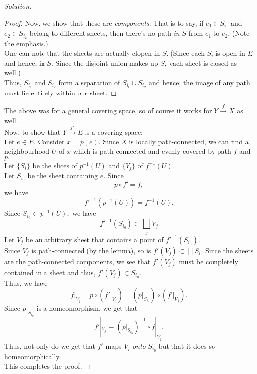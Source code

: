 \documentclass[12pt]{article}
\newenvironment{blockquote}
{\begin{mdframed}[skipabove=0pt, skipbelow=0pt, innertopmargin=4pt, innerbottommargin=4pt, bottomline=false,topline=false,rightline=false, linewidth=2pt]}
{\end{mdframed}}
\newenvironment{soln}{\begin{proof}[Solution]}{\end{proof}}
\begin{document}
\begin{soln}
\begin{blockquote}
\begin{proof}
			Now, we show that these are \emph{components}. That is to say, if $e_1 \in S_{i_1}$ and $e_2 \in S_{i_2}$ belong to different sheets, then there's no path \emph{in $S$} from $e_1$ to $e_2.$ (Note the emphasis.)\\
			One can note that the sheets are actually clopen in $S.$ (Since each $S_i$ is open in $E$ and hence, in $S.$ Since the disjoint union makes up $S,$ each sheet is closed as well.)\\
			Thus, $S_{i_1}$ and $S_{i_2}$ form a separation of $S_{i_1}\cup S_{i_2}$ and hence, the image of any path must lie entirely within one sheet.
		\end{proof}
	\end{blockquote}
	The above was for a general covering space, so of course it works for $Y \overset{f}{\longrightarrow} X$ as well.\\
	Now, to show that $Y\overset{f'}{\longrightarrow}E$ is a covering space:\\
	Let $e \in E.$ Consider $x = p(e).$ Since $X$ is locally path-connected, we can find a neighbourhood $U$ of $x$ which is path-connected and evenly covered by path $f$ and $p.$\\
	Let $\{S_i\}$ be the slices of $p^{-1}(U)$ and $\{V_j\}$ of $f^{-1}(U).$\\
	Let $S_{i_0}$ be the sheet containing $e.$ Since
	\begin{equation*} 
		p\circ f' = f,
	\end{equation*}
	we have
	\begin{equation*} 
		f'^{-1}(p^{-1}(U)) = f^{-1}(U).
	\end{equation*}
	Since $S_{i_0} \subset p^{-1}(U),$ we have 
	\begin{equation*} 
		f'^{-1}(S_{i_0}) \subset \bigsqcup_j V_j
	\end{equation*}
	Let $V_j$ be an arbitrary sheet that contains a point of $f'^{-1}(S_{i_0}).$\\
	Since $V_j$ is path-connected (by the lemma), so is $f'(V_j) \subset \bigsqcup S_i.$ Since the sheets are the path-connected components, we see that $f'(V_j)$ must be completely contained in a sheet and thus, $f'(V_j) \subset S_{i_0}.$ \\
	Thus, we have
	\begin{equation*} 
		f|_{V_j} = p\circ(f'|_{V_j}) = \left(p|_{S_{i_0}}\right)\circ\left(f'|_{V_j}\right).
	\end{equation*}
	Since $p|_{S_{i_0}}$ is a homeomorphism, we get that
	\begin{equation*} 
		f'|_{V_j} = \left(p|_{S_{i_0}}\right)^{-1}\circ f|_{V_j}.
	\end{equation*}
	Thus, not only do we get that $f'$ maps $V_j$ \emph{onto} $S_{i_0}$ but that it does so homeomorphically.\\
	This completes the proof.	
\end{soln}
\end{document}
